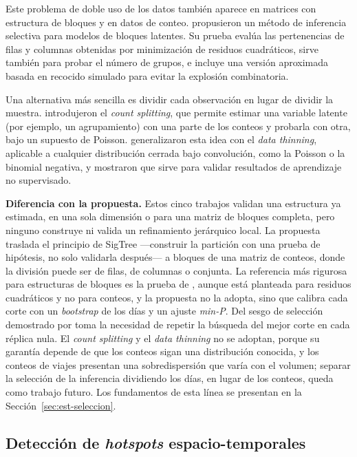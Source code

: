 Este problema de doble uso de los datos también aparece en matrices con
estructura de bloques y en datos de conteo. \citet{Watanabe2021si}
propusieron un método de inferencia selectiva para modelos de bloques
latentes. Su prueba evalúa las pertenencias de filas y columnas obtenidas
por minimización de residuos cuadráticos, sirve también para probar el
número de grupos, e incluye una versión aproximada basada en recocido
simulado para evitar la explosión combinatoria.

Una alternativa más sencilla es dividir cada observación en lugar de
dividir la muestra. \citet{Neufeld2024cs} introdujeron el \emph{count
splitting}, que permite estimar una variable latente (por ejemplo, un
agrupamiento) con una parte de los conteos y probarla con otra, bajo un
supuesto de Poisson. \citet{Neufeld2024dt} generalizaron esta idea con el
\emph{data thinning}, aplicable a cualquier distribución cerrada bajo
convolución, como la Poisson o la binomial negativa, y mostraron que sirve
para validar resultados de aprendizaje no supervisado.

\textbf{Diferencia con la propuesta.} Estos cinco trabajos validan una
estructura ya estimada, en una sola dimensión o para una matriz de bloques
completa, pero ninguno construye ni valida un refinamiento jerárquico
local. La propuesta traslada el principio de SigTree —construir la
partición con una prueba de hipótesis, no solo validarla después— a
bloques de una matriz de conteos, donde la división puede ser de filas, de
columnas o conjunta. La referencia más rigurosa para estructuras de bloques es
la prueba de \citet{Watanabe2021si}, aunque está planteada para residuos
cuadráticos y no para conteos, y la propuesta no la adopta, sino que calibra
cada corte con un \emph{bootstrap} de los días y un ajuste \emph{min-P}. Del
sesgo de selección demostrado por \citet{Gao2024} toma la necesidad de repetir
la búsqueda del mejor corte en cada réplica nula. El \emph{count splitting} y el
\emph{data thinning} no se adoptan, porque su garantía depende de que los conteos
sigan una distribución conocida, y los conteos de viajes presentan una
sobredispersión que varía con el volumen; separar la selección de la inferencia
dividiendo los días, en lugar de los conteos, queda como trabajo futuro. Los
fundamentos de esta línea se presentan en la Sección~\ref{sec:est-seleccion}.

\subsection{Detección de \emph{hotspots} espacio-temporales}
\label{sec:ea_hotspots}

